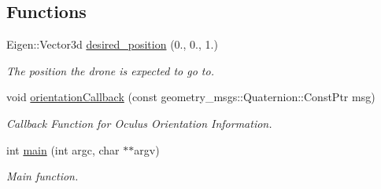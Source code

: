 \subsection*{Functions}
\begin{DoxyCompactItemize}
\item 
Eigen\+::\+Vector3d \hyperlink{oculus-control_8cpp_a608d9948c063034b7605598daaeccc3e}{desired\+\_\+position} (0., 0., 1.)
\begin{DoxyCompactList}\small\item\em The position the drone is expected to go to. \end{DoxyCompactList}\item 
void \hyperlink{oculus-control_8cpp_a570d60ef77ebe021853fd13c864ab969}{orientation\+Callback} (const geometry\+\_\+msgs\+::\+Quaternion\+::\+Const\+Ptr msg)
\begin{DoxyCompactList}\small\item\em Callback Function for Oculus Orientation Information. \end{DoxyCompactList}\item 
int \hyperlink{oculus-control_8cpp_a3c04138a5bfe5d72780bb7e82a18e627}{main} (int argc, char $\ast$$\ast$argv)
\begin{DoxyCompactList}\small\item\em Main function. \end{DoxyCompactList}\end{DoxyCompactItemize}
